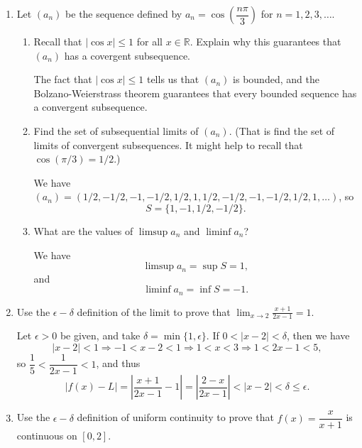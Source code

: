 \documentclass[12pt]{article}
\newcommand{\points}[1]{\marginpar{\hspace{24pt}[#1]}}
\newcommand{\R}{\mathbb{R}}
\newcommand{\abs}[1]{\lvert #1\rvert}
\newcommand{\Abs}[1]{\left| #1 \right|}
\begin{document}
\begin{enumerate}
\item Let $(a_n)$ be the sequence defined by $a_n = \cos\left(\dfrac{n\pi}{3}\right)$ for $n=1,2,3,\ldots$.
\begin{enumerate}
 \item Recall that $\abs{\cos x}\leq 1$ for all $x\in\R$. Explain why this guarantees that $(a_n)$ has a covergent subsequence.\points{2}

\bigskip

The fact that $\abs{\cos x}\leq 1$ tells us that $(a_n)$ is bounded, and the Bolzano-Weierstrass theorem guarantees that every bounded sequence has a convergent subsequence.

\bigskip

 \item Find the set of subsequential limits of $(a_n)$. (That is find the set of limits of convergent subsequences. It might help to recall that $\cos(\pi/3)=1/2$.) \points{4}

\bigskip

We have $(a_n) = (1/2, -1/2, -1, -1/2, 1/2, 1, 1/2, -1/2, -1, -1/2, 1/2, 1, \ldots )$, so
\[
S = \{1,-1, 1/2, -1/2\}.
\]

\bigskip

 \item What are the values of $\limsup a_n$ and $\liminf a_n$?\points{2}
 
 \bigskip
 
 We have
 \[
 \limsup a_n = \sup S = 1,
 \]
 and
 \[
 \liminf a_n = \inf S = -1.
 \]
\end{enumerate}
\newpage

\item Use the $\epsilon-\delta$ definition of the limit to prove that $\displaystyle \lim_{x\to 2}\frac{x+1}{2x-1}=1$. \points{5}

\bigskip

Let $\epsilon>0$ be given, and take $\delta = \min\{1,\epsilon\}$. If $0<\abs{x-2}<\delta$, then we have
\[
\abs{x-2}<1 \Rightarrow -1<x-2<1 \Rightarrow 1<x<3 \Rightarrow 1<2x-1 < 5,
\]
so $\dfrac{1}{5}<\dfrac{1}{2x-1}<1$, and thus
\[
\abs{f(x)-L} = \Abs{\frac{x+1}{2x-1}-1} = \Abs{\frac{2-x}{2x-1}}<\abs{x-2}<\delta\leq\epsilon.
\]

\bigskip

\item Use the $\epsilon-\delta$ definition of uniform continuity to prove that $f(x) = \dfrac{x}{x+1}$ is continuous on $[0,2]$.\points{5}


\end{enumerate}
\end{document}
